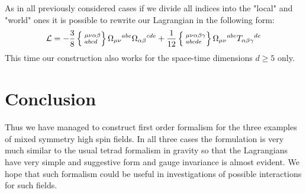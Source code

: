 \documentclass[a4paper,12pt]{article}
\begin{document}
As in all previously considered cases if we divide all indices into
the "local" and "world" ones it is possible to rewrite our Lagrangian
in the following form:
\begin{equation}
{\cal L} = - \frac{3}{8} \left\{
\phantom{|}^{\mu\nu\alpha\beta}_{abcd} \right\}
\Omega_{\mu\nu}{}^{abe} \Omega_{\alpha\beta}{}^{cde} + \frac{1}{12}
\left\{ \phantom{|}^{\mu\nu\alpha\beta\gamma}_{abcde} \right\}
\Omega_{\mu\nu}{}^{abc} T_{\alpha\beta\gamma}{}^{de}
\end{equation}
This time our construction also works for the space-time dimensions
$d \ge 5$ only.


\section*{Conclusion}

Thus we have managed to construct first order formalism for the three
examples of mixed symmetry high spin fields. In all three cases the
formulation is very much similar to the usual tetrad formalism in
gravity so that the Lagrangians have very simple and suggestive form
and gauge invariance is almost evident. We hope that such formalism
could be useful in investigations of possible interactions for such
fields.


\newpage
\end{document}
